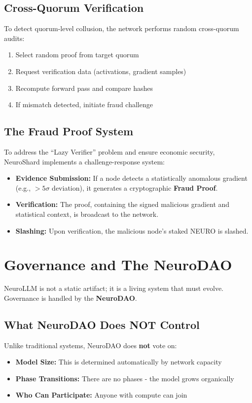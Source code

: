 \documentclass[11pt,a4paper]{article}
\begin{document}
\subsection{Cross-Quorum Verification}
To detect quorum-level collusion, the network performs random cross-quorum audits:
\begin{enumerate}
    \item Select random proof from target quorum
    \item Request verification data (activations, gradient samples)
    \item Recompute forward pass and compare hashes
    \item If mismatch detected, initiate fraud challenge
\end{enumerate}

\subsection{The Fraud Proof System}
To address the ``Lazy Verifier'' problem and ensure economic security, NeuroShard implements a challenge-response system:
\begin{itemize}
    \item \textbf{Evidence Submission:} If a node detects a statistically anomalous gradient (e.g., $>5\sigma$ deviation), it generates a cryptographic \textbf{Fraud Proof}.
    \item \textbf{Verification:} The proof, containing the signed malicious gradient and statistical context, is broadcast to the network.
    \item \textbf{Slashing:} Upon verification, the malicious node's staked NEURO is slashed.
\end{itemize}

\section{Governance and The NeuroDAO}

NeuroLLM is not a static artifact; it is a living system that must evolve. Governance is handled by the \textbf{NeuroDAO}.

\subsection{What NeuroDAO Does NOT Control}
Unlike traditional systems, NeuroDAO does \textbf{not} vote on:
\begin{itemize}
    \item \textbf{Model Size:} This is determined automatically by network capacity
    \item \textbf{Phase Transitions:} There are no phases - the model grows organically
    \item \textbf{Who Can Participate:} Anyone with compute can join
\end{itemize}
\end{document}
